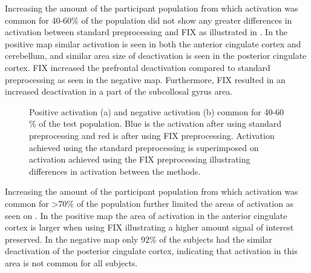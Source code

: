 Increasing the amount of the participant population from which activation was common for 40-60$\percent$ of the population did not show any greater differences in activation between standard preprocessing and FIX as illustrated in . In the positive map similar activation is seen in both the anterior cingulate cortex and cerebellum, and similar area size of deactivation is seen in the posterior cingulate cortex. FIX increased the prefrontal deactivation compared to standard preprocessing as seen in the negative map. Furthermore, FIX resulted in an increased deactivation in a part of the subcollosal gyrus area.

\begin{figure}[H]%
	\centering
	\qquad
	\caption{Positive activation (a) and negative activation (b) common for 40-60$\percent$ of the test population. Blue is the activation after using standard preprocessing and red is after using FIX preprocessing. Activation achieved using the standard preprocessing is superimposed on activation achieved using the FIX preprocessing illustrating differences in activation between the methods.}
	\label{fig:40}
\end{figure}

Increasing the amount of the participant population from which activation was common for >70$\%$ of the population further limited the areas of activation as seen on . In the positive map the area of activation in the anterior cingulate cortex is larger when using FIX illustrating a higher amount signal of interest preserved. In the negative map only 92$\percent$ of the subjects had the similar deactivation of the posterior cingulate cortex, indicating that activation in this area is not common for all subjects. 

